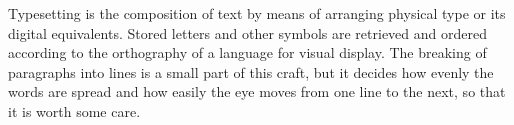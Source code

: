 \documentclass{scrartcl}
\begin{document}
Typesetting is the composition of text by means of arranging physical type or its digital equivalents. Stored letters and other symbols are retrieved and ordered according to the orthography of a language for visual display.
\newpage
\thispagestyle{plain}
The breaking of paragraphs into lines is a small part of this craft, but it decides how evenly the words are spread and how easily the eye moves from one line to the next, so that it is worth some care.
\end{document}
